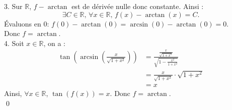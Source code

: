 \documentclass[10pt]{article}
\begin{document}
\begin{tcolorbox}[enhanced, width=6in, center, size=fbox, fontupper=\large, drop shadow southwest]
\begin{equation*}
    \end{equation*}
    3. Sur $\mathbb{R}$, $f-\arctan$ est de dérivée nulle donc constante. Ainsi :
    \begin{equation*}
        \exists C\in\mathbb{R} \text{, } \forall{x}\in\mathbb{R} \text{, } f(x)-\arctan(x)=C.
    \end{equation*}
    Évaluons en $0$: $f(0)-\arctan(0)=\arcsin(0)-\arctan(0)=0$.\\
    Donc $f=\arctan$.\\[0.25cm]
    4. Soit $x\in\mathbb{R}$, on a :
    \begin{align*}
        \tan\left(\arcsin\left(\frac{x}{\sqrt{1+x^2}}\right)\right)&=\frac{\frac{x}{\sqrt{1+x^2}}}{\sqrt{1-\frac{x^2}{1+x^2}}}\\
        &=\frac{x}{\sqrt{1+x^2}}\cdot\sqrt{1+x^2}\\
        &=x
    \end{align*}
    Ainsi, $\forall{x\in\mathbb{R}}$, $\tan(f(x))=x$. Donc $f=\arctan$.\\
    \qed
\end{tcolorbox}

\end{document}
